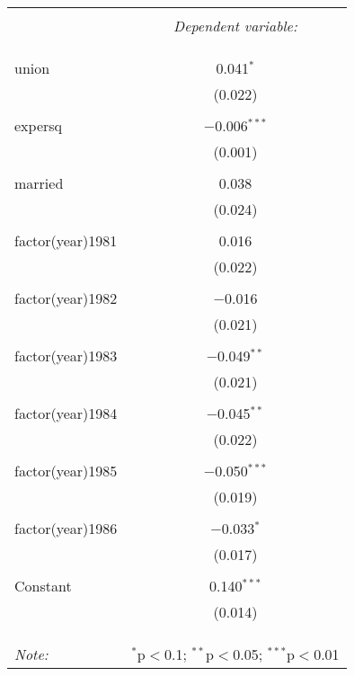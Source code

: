 
\begin{table}[!htbp] \centering 
  \caption{} 
  \label{} 
\begin{tabular}{@{\extracolsep{5pt}}lc} 
\\[-1.8ex]\hline 
\hline \\[-1.8ex] 
 & \multicolumn{1}{c}{\textit{Dependent variable:}} \\ 
\cline{2-2} 
\\[-1.8ex] &   \\ 
\hline \\[-1.8ex] 
 union & 0.041$^{*}$ \\ 
  & (0.022) \\ 
  & \\ 
 expersq & $-$0.006$^{***}$ \\ 
  & (0.001) \\ 
  & \\ 
 married & 0.038 \\ 
  & (0.024) \\ 
  & \\ 
 factor(year)1981 & 0.016 \\ 
  & (0.022) \\ 
  & \\ 
 factor(year)1982 & $-$0.016 \\ 
  & (0.021) \\ 
  & \\ 
 factor(year)1983 & $-$0.049$^{**}$ \\ 
  & (0.021) \\ 
  & \\ 
 factor(year)1984 & $-$0.045$^{**}$ \\ 
  & (0.022) \\ 
  & \\ 
 factor(year)1985 & $-$0.050$^{***}$ \\ 
  & (0.019) \\ 
  & \\ 
 factor(year)1986 & $-$0.033$^{*}$ \\ 
  & (0.017) \\ 
  & \\ 
 Constant & 0.140$^{***}$ \\ 
  & (0.014) \\ 
  & \\ 
\hline \\[-1.8ex] 
\hline 
\hline \\[-1.8ex] 
\textit{Note:}  & \multicolumn{1}{r}{$^{*}$p$<$0.1; $^{**}$p$<$0.05; $^{***}$p$<$0.01} \\ 
\end{tabular} 
\end{table} 
